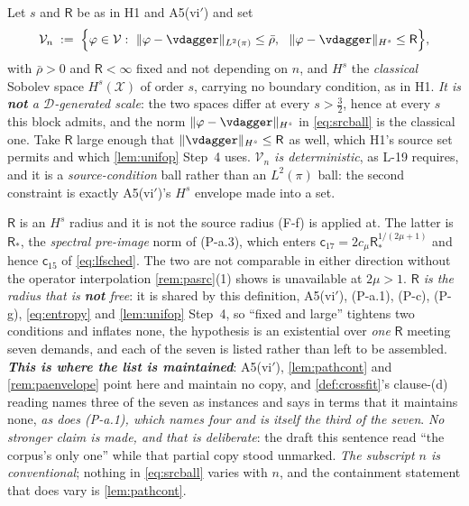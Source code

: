 \begin{definition}\label{def:srcball}
Let $s$ and $\mathsf R$ be as in H1 and A5(vi$'$) and set
\begin{equation}\label{eq:srcball}
\mathcal V_n\;:=\;\Big\{\varphi\in\mathcal V:\ \|\varphi-\vdagger\|_{L^{2}(\pi)}\le\bar\rho,\ \
\|\varphi-\vdagger\|_{H^{s}}\le\mathsf R\Big\},
\end{equation}
with $\bar\rho>0$ and $\mathsf R<\infty$ fixed and not depending on $n$, and $H^{s}$ the \emph{classical}
Sobolev space $H^{s}(\mathcal X)$ of order $s$, carrying no boundary condition, as in H1.
\emph{It is \textbf{not} a $\mathcal D$-generated scale}: the two spaces differ at every $s>\tfrac32$,
hence at every $s$ this block admits, and the norm
$\|\varphi-\vdagger\|_{H^{s}}$ in \eqref{eq:srcball} is the classical one.
Take $\mathsf R$ large enough that
$\|\vdagger\|_{H^{s}}\le\mathsf R$ as well, which H1's source set permits and which
\cref{lem:unifop} Step~4 uses. \emph{$\mathcal V_n$ is
deterministic}, as L-19 requires, and it is a \emph{source-condition} ball rather than an $L^{2}(\pi)$
ball: the second constraint is exactly A5(vi$'$)'s $H^{s}$ envelope made into a set.

$\mathsf R$ is an $H^{s}$ radius and it is not the source radius (F-f) is applied at. The latter
is $\mathsf R_\ast$, the \emph{spectral pre-image} norm of (P-a.3), which enters
$\mathsf c_{17}=2c_\mu\mathsf R_\ast^{1/(2\mu+1)}$ and hence $\mathsf c_{15}$ of \eqref{eq:lfsched}.
The two are not comparable in either direction without the
operator interpolation \cref{rem:pasrc}\textup{(1)} shows is unavailable at $2\mu>1$. \emph{$\mathsf R$
is the radius that is \textbf{not} free}: it is shared by this definition, A5(vi$'$), (P-a.1), (P-c),
(P-g), \eqref{eq:entropy} and \cref{lem:unifop} Step~4, so ``fixed and large'' tightens two conditions
and inflates none, the hypothesis is an existential over \emph{one} $\mathsf R$ meeting seven
demands, and each of the seven is listed rather than left to be assembled.
\emph{\textbf{This is where the list is maintained}}: A5(vi$'$), \cref{lem:pathcont} and
\cref{rem:paenvelope} point here and maintain no copy, and \cref{def:crossfit}'s clause-\textup{(d)}
reading names three of the seven as instances and says in terms that it maintains none, \emph{as does
\textup{(P-a.1)}, which names four and is itself the third of the seven}.
\emph{No stronger claim is made, and that is deliberate}: the draft this sentence read ``the
corpus's only one'' while that partial copy stood unmarked. \emph{The subscript $n$ is conventional}; nothing
in \eqref{eq:srcball} varies with $n$, and the containment statement that does vary is
\cref{lem:pathcont}.


\end{definition}

